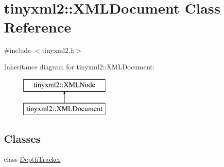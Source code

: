 \hypertarget{classtinyxml2_1_1XMLDocument}{}\section{tinyxml2\+::X\+M\+L\+Document Class Reference}
\label{classtinyxml2_1_1XMLDocument}


{\ttfamily \#include $<$tinyxml2.\+h$>$}

Inheritance diagram for tinyxml2\+::X\+M\+L\+Document\+:\begin{figure}[H]
\begin{center}
\leavevmode
\includegraphics[height=2.000000cm]{classtinyxml2_1_1XMLDocument}
\end{center}
\end{figure}
\subsection*{Classes}
\begin{DoxyCompactItemize}
\item 
class \mbox{\hyperlink{classtinyxml2_1_1XMLDocument_1_1DepthTracker}{Depth\+Tracker}}
\end{DoxyCompactItemize}
